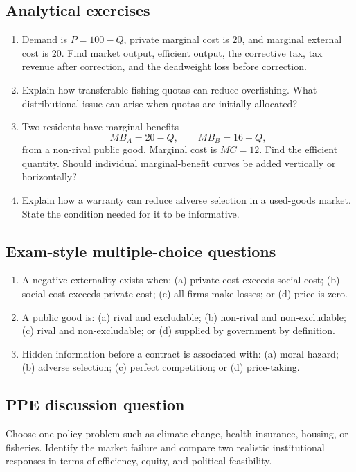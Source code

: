 \subsection*{Analytical exercises}
\begin{enumerate}[resume,label=\arabic*.]
  \item Demand is $P=100-Q$, private marginal cost is $20$, and marginal external cost is $20$. Find market output, efficient output, the corrective tax, tax revenue after correction, and the deadweight loss before correction.
  \item Explain how transferable fishing quotas can reduce overfishing. What distributional issue can arise when quotas are initially allocated?
  \item Two residents have marginal benefits
  \[
  MB_A=20-Q,
  \qquad
  MB_B=16-Q,
  \]
  from a non-rival public good. Marginal cost is $MC=12$. Find the efficient quantity. Should individual marginal-benefit curves be added vertically or horizontally?
  \item Explain how a warranty can reduce adverse selection in a used-goods market. State the condition needed for it to be informative.
\end{enumerate}

\subsection*{Exam-style multiple-choice questions}
\begin{enumerate}[resume,label=\arabic*.]
  \item A negative externality exists when: (a) private cost exceeds social cost; (b) social cost exceeds private cost; (c) all firms make losses; or (d) price is zero.
  \item A public good is: (a) rival and excludable; (b) non-rival and non-excludable; (c) rival and non-excludable; or (d) supplied by government by definition.
  \item Hidden information before a contract is associated with: (a) moral hazard; (b) adverse selection; (c) perfect competition; or (d) price-taking.
\end{enumerate}

\subsection*{PPE discussion question}

\noindent Choose one policy problem such as climate change, health insurance,
housing, or fisheries. Identify the market failure and compare two realistic
institutional responses in terms of efficiency, equity, and political
feasibility.
